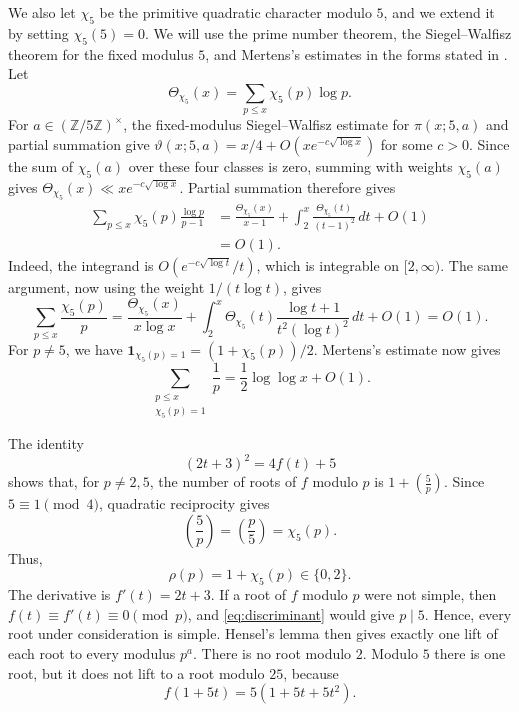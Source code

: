 \documentclass[11pt]{amsart}
\theoremstyle{definition}
\theoremstyle{remark}
\begin{document}
We also let $\chi_5$ be the primitive quadratic character modulo $5$, and we
extend it by setting $\chi_5(5)=0$.  We will use the prime number theorem, the
Siegel--Walfisz theorem for the fixed modulus $5$, and Mertens's estimates in
the forms stated in
\cite[Theorems 3.4, 8.1 and 12.1]{Koukoulopoulos}.  Let
\[
\Theta_{\chi_5}(x)=\sum_{p\leq x}\chi_5(p)\log p.
\]
For $a\in(\mathbb Z/5\mathbb Z)^\times$, the fixed-modulus Siegel--Walfisz
estimate for $\pi(x;5,a)$ and partial summation give
$\vartheta(x;5,a)=x/4+O(xe^{-c\sqrt{\log x}})$ for some $c>0$.  Since the
sum of $\chi_5(a)$ over these four classes is zero, summing with weights
$\chi_5(a)$ gives
$\Theta_{\chi_5}(x)\ll xe^{-c\sqrt{\log x}}$.
Partial summation therefore gives
\begin{equation}\label{eq:chi}
\begin{aligned}
\sum_{p\leq x}\chi_5(p)\frac{\log p}{p-1}
&=\frac{\Theta_{\chi_5}(x)}{x-1}
 +\int_2^x\frac{\Theta_{\chi_5}(t)}{(t-1)^2}\,dt+O(1)\\
&=O(1).
\end{aligned}
\end{equation}
Indeed, the integrand is $O(e^{-c\sqrt{\log t}}/t)$, which is integrable on
$[2,\infty)$.  The same argument, now using the weight $1/(t\log t)$,
gives
\[
\sum_{p\leq x}\frac{\chi_5(p)}p
=\frac{\Theta_{\chi_5}(x)}{x\log x}
 +\int_2^x\Theta_{\chi_5}(t)
 \frac{\log t+1}{t^2(\log t)^2}\,dt+O(1)
=O(1).
\]
For $p\neq5$, we have
$\mathbf 1_{\chi_5(p)=1}=(1+\chi_5(p))/2$.  Mertens's estimate now gives
\begin{equation}\label{eq:split}
\sum_{\substack{p\leq x\\ \chi_5(p)=1}}\frac1p
=\frac12\log\log x+O(1).
\end{equation}

The identity
\begin{equation}\label{eq:discriminant}
(2t+3)^2=4f(t)+5
\end{equation}
shows that, for $p\neq2,5$, the number of roots of $f$ modulo $p$ is
$1+\left(\frac5p\right)$.  Since $5\equiv1\pmod4$, quadratic reciprocity
gives
\[
\left(\frac5p\right)=\left(\frac p5\right)=\chi_5(p).
\]
Thus,
\begin{equation}\label{eq:rho}
\rho(p)=1+\chi_5(p)\in\{0,2\}.
\end{equation}
The derivative is $f'(t)=2t+3$.  If a root of $f$ modulo $p$ were not simple,
then $f(t)\equiv f'(t)\equiv0\pmod p$, and \eqref{eq:discriminant} would give
$p\mid5$.  Hence, every root under consideration is simple.  Hensel's lemma
then gives exactly one lift of each root to every modulus $p^a$.  There is no
root modulo $2$.  Modulo $5$ there is one root, but it does not lift to a root
modulo $25$, because
\begin{equation}\label{eq:five}
f(1+5t)=5(1+5t+5t^2).
\end{equation}
\end{document}
